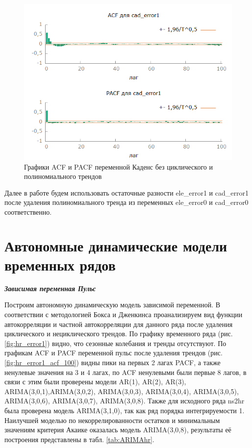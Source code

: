 \documentclass[a4paper,12pt]{article}
\begin{document}
\begin{figure}[H]
	\centering
	\includegraphics[width=0.5\linewidth]{../[graphics]/cad_error1_acf_100.png}
	\caption{Графики ACF и PACF переменной Каденс без циклического и полиномиального трендов}
	\label{fig:cad_error1_acf_100}
\end{figure}

Далее в работе будем использовать остаточные разности ele\_error1 и cad\_error1 после удаления полиномиального тренда из переменных ele\_error0 и cad\_error0 соответственно.

\section{Автономные динамические модели временных рядов}

\textbf{\textit{Зависимая переменная Пульс}}
		
Построим автономную динамическую модель зависимой переменной.
В соответствии с методологией Бокса и Дженкинса проанализируем вид функции автокорреляции и частной автокорреляции для данного ряда после удаления циклического и нециклического трендов. По графику временного ряда (рис. \ref{fig:hr_error1}) видно, что сезонные колебания и тренды отсутствуют. По графикам ACF и PACF переменной пульс после удаления трендов (рис. \ref{fig:hr_error1_acf_100}) видны пики на первых 2 лагах PACF, а также ненулевые значения на 3 и 4 лагах, по ACF ненулевыми были первые 8 лагов, в связи с этим были проверены модели AR(1), AR(2), AR(3), ARIMA(3,0,1),ARIMA(3,0,2), ARIMA(3,0,3), ARIMA(3,0,4), ARIMA(3,0,5), ARIMA(3,0,6), ARIMA(3,0,7), ARIMA(3,0,8). Также для исходного ряда ns2hr была проверена модель ARIMA(3,1,0), так как ряд порядка интегрируемости 1. Наилучшей моделью по некоррелированности остатков и минимальным значениям критерия Акаике оказалась модель ARIMA(3,0,8), результаты её построения представлены в табл. \ref{tab:ARIMAhr}.
\end{document}
